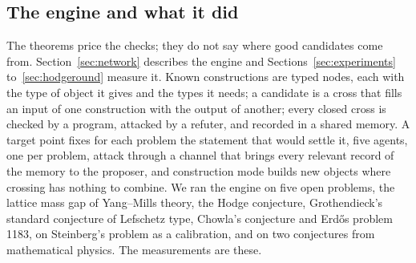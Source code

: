 \subsection{The engine and what it did}

The theorems price the checks; they do not say where good candidates come from. Section~\ref{sec:network} describes the engine and Sections~\ref{sec:experiments} to~\ref{sec:hodgeround} measure it. Known constructions are typed nodes, each with the type of object it gives and the types it needs; a candidate is a cross that fills an input of one construction with the output of another; every closed cross is checked by a program, attacked by a refuter, and recorded in a shared memory. A target point fixes for each problem the statement that would settle it, five agents, one per problem, attack through a channel that brings every relevant record of the memory to the proposer, and construction mode builds new objects where crossing has nothing to combine. We ran the engine on five open problems, the lattice mass gap of Yang--Mills theory, the Hodge conjecture, Grothendieck's standard conjecture of Lefschetz type, Chowla's conjecture and Erd\H{o}s problem 1183, on Steinberg's problem as a calibration, and on two conjectures from mathematical physics. The measurements are these.
